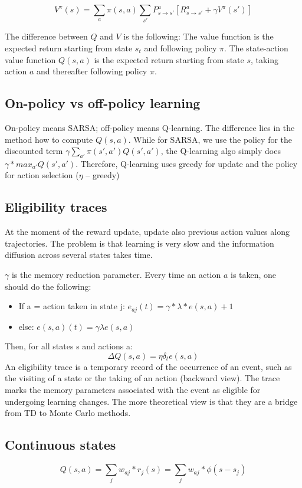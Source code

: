 \documentclass[11pt]{article}
\begin{document}
\[
	V^{\pi}(s) = \sum_a \pi(s,a) \sum_{s'} P_{s \rightarrow s'}^a[R_{s \rightarrow s'}^a + \gamma V^{\pi}(s')]
\]

The difference between $Q$ and $V$ is the following: The value function is the expected return starting from state $s_t$ and following policy $\pi$. The state-action value function $Q(s,a)$ is the expected return starting from state $s$, taking action $a$ and thereafter following policy $\pi$.

\subsection{On-policy vs off-policy learning}
On-policy means SARSA; off-policy means Q-learning. The difference lies in the method how to compute $Q(s,a)$. While for SARSA, we use the policy for the discounted term $\gamma \sum_{a'} \pi(s',a')Q(s',a')$, the Q-learning algo simply does $\gamma * max_{a'}Q(s',a')$. Therefore, Q-learning uses greedy for update and the policy for action selection ($\eta$ -- greedy)

\subsection{Eligibility traces}
At the moment of the reward update, update also previous action values along trajectories. The problem is that learning is very slow and the information diffusion across several states takes time.

$\gamma$ is the memory reduction parameter.
Every time an action $a$ is taken, one should do the following:
\begin{itemize}
	\item If a = action taken in state j: $e_{aj}(t) = \gamma * \lambda * e(s,a) + 1$
	\item else: $e(s,a)(t) = \gamma \lambda e(s,a)$ 
\end{itemize}
Then, for all states s and actions a:
\[
	\Delta Q(s,a) = \eta \delta_t e(s,a)
\]
An eligibility trace is a temporary record of the occurrence of an event, such as the visiting of a state or the taking of an action (backward view). The trace marks the memory parameters associated with the event as eligible for undergoing learning changes. The more theoretical view is that they are a bridge from TD to Monte Carlo methods.

\subsection{Continuous states}
\[
	Q(s,a) = \sum_j w_{aj}*r_j(s) = \sum_j w_{aj}*\phi(s-s_j)
\]
\end{document}
